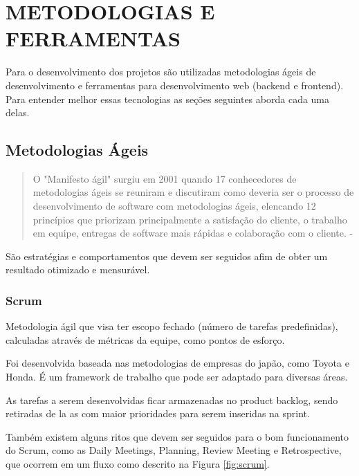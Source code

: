 \chapter{METODOLOGIAS E FERRAMENTAS}
\label{cap:elementos}

Para o desenvolvimento dos projetos são utilizadas metodologias ágeis de desenvolvimento e ferramentas para desenvolvimento web (backend e frontend). Para entender melhor essas tecnologias as seções seguintes aborda cada uma delas.
\section{Metodologias Ágeis}

\begin{quote}
  O "Manifesto ágil" surgiu em 2001 quando 17 conhecedores de metodologias ágeis se reuniram e discutiram como deveria ser o processo de desenvolvimento de software com metodologias ágeis, elencando 12 princípios que priorizam principalmente a satisfação do cliente, o trabalho em equipe, entregas de software mais rápidas e colaboração com o cliente. - \cite{manifestoAgil}
\end{quote}

São estratégias e comportamentos que devem ser seguidos afim de obter um resultado otimizado e mensurável.

\subsection{Scrum}

Metodologia ágil que visa ter escopo fechado (número de tarefas predefinidas), calculadas através de métricas da equipe, como pontos de esforço.

Foi desenvolvida baseada nas metodologias de empresas do japão, como Toyota e Honda. É um framework de trabalho que pode ser adaptado para diversas áreas.

As tarefas a serem desenvolvidas ficar armazenadas no product backlog, sendo retiradas de la as com maior prioridades para serem inseridas na sprint.

Também existem alguns ritos que devem ser seguidos para o bom funcionamento do Scrum, como as Daily Meetings, Planning, Review Meeting e Retrospective, que ocorrem em um fluxo como descrito na Figura \ref{fig:scrum}.

